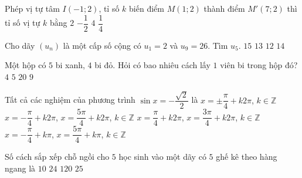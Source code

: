 \begin{ex}%
	 Phép vị tự tâm $I(-1; 2)$, tỉ số $k$ biến điểm $M(1;2)$ thành điểm $M'(7;2)$ thì tỉ số vị tự $k$ bằng
	\choice
	{$2$}
	{$-\dfrac{1}{2}$}
	{\True $4$}
	{$\dfrac{1}{4}$}
\end{ex}

\begin{ex}%
	Cho dãy $(u_n)$ là một cấp số cộng có $u_1 =2$ và $u_9 = 26$. Tìm $u_5$.
	\choice
	{$15$}
	{$13$}
	{$12$}
	{\True $14$}
\end{ex}

\begin{ex}%
	Một hộp có $5$ bi xanh, $4$ bi đỏ. Hỏi có bao nhiêu cách lấy $1$ viên bi trong hộp đó? 
	\choice
	{$4$}
	{$5$}
	{$20$}
	{\True $9$}
\end{ex}

\begin{ex}%
	Tất cả các nghiệm của phương trình $\sin x = - \dfrac{\sqrt{2}}{2}$ là
	\choice
	{$x=\pm \dfrac{\pi}{4}+k2\pi$, $k\in\mathbb{Z}$}
	{\True $x= - \dfrac{\pi}{4}+k2\pi$, $x=\dfrac{5\pi}{4} + k2\pi$, $k\in\mathbb{Z}$}
	{$x= \dfrac{\pi}{4}+k2\pi$, $x= \dfrac{3\pi}{4} + k2\pi$, $k\in\mathbb{Z}$}
	{$x=-\dfrac{\pi}{4}+k\pi$, $x=\dfrac{5\pi}{4} +k\pi$, $k\in\mathbb{Z}$}
	\loigiai{
	$\sin x = - \dfrac{\sqrt{2}}{2} = \sin \left(-\dfrac{\pi}{4}\right)$
	$\Leftrightarrow \left[\begin{array}{l} x= - \dfrac{\pi}{4}+k2\pi \\ x=\dfrac{5\pi}{4} + k2\pi, \end{array} \right.$ $k\in\mathbb{Z}$.
	}
\end{ex}

\begin{ex}%
	 Số cách sắp xếp chỗ ngồi cho $5$ học sinh vào một dãy có $5$ ghế kê theo hàng ngang là 
	\choice
	{$10$}
	{$24$}
	{\True $120$}
	{$25$}
\end{ex}

